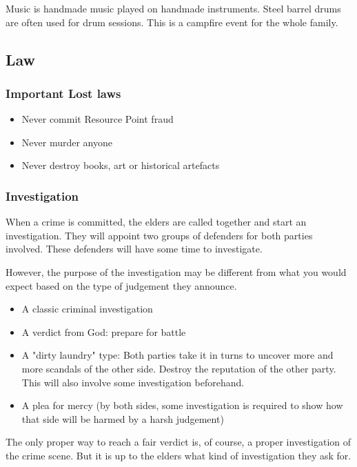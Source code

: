 Music is handmade music played on handmade instruments. Steel barrel drums are often used for drum sessions. This is a campfire event for the whole family.

\subsection{Law}
\label{sec:Lost law}

\subsubsection{Important Lost laws}

\begin{itemize}
\item{Never commit Resource Point fraud}
\item{Never murder anyone}
\item{Never destroy books, art or historical artefacts}
\end{itemize}

\subsubsection{Investigation}

When a crime is committed, the elders are called together and start an investigation. They will appoint two groups of defenders for both parties involved. These defenders will have some time to investigate.

However, the purpose of the investigation may be different from what you would expect based on the type of judgement they announce.

\begin{itemize}
    \item A classic criminal investigation
    \item A verdict from God: prepare for battle
    \item A "dirty laundry" type: Both parties take it in turns to uncover more and more scandals of the other side. Destroy the reputation of the other party. This will also involve some investigation beforehand.
    \item A plea for mercy (by both sides, some investigation is required to show how that side will be harmed by a harsh judgement)
\end{itemize}

The only proper way to reach a fair verdict is, of course, a proper investigation of the crime scene. But it is up to the elders what kind of investigation they ask for.

